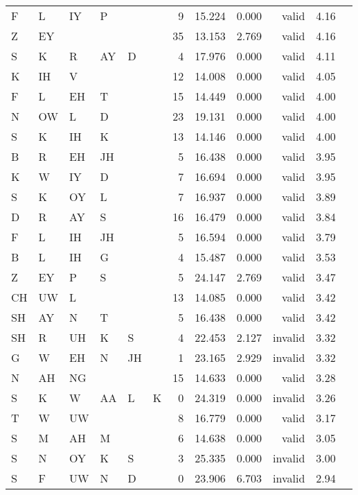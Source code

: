 \begin{longtable}{l@{ } l@{ } l@{ } l@{ } l@{ } l r r r r r r}
F  & L  & IY & P  &    &   &  9 & 15.224 & 0.000 & valid   & 4.16 \\
Z  & EY &    &    &    &   & 35 & 13.153 & 2.769 & valid   & 4.16 \\
S  & K  & R  & AY & D  &   &  4 & 17.976 & 0.000 & valid   & 4.11 \\
K  & IH & V  &    &    &   & 12 & 14.008 & 0.000 & valid   & 4.05 \\
F  & L  & EH & T  &    &   & 15 & 14.449 & 0.000 & valid   & 4.00 \\
N  & OW & L  & D  &    &   & 23 & 19.131 & 0.000 & valid   & 4.00 \\
S  & K  & IH & K  &    &   & 13 & 14.146 & 0.000 & valid   & 4.00 \\
B  & R  & EH & JH &    &   &  5 & 16.438 & 0.000 & valid   & 3.95 \\
K  & W  & IY & D  &    &   &  7 & 16.694 & 0.000 & valid   & 3.95 \\
S  & K  & OY & L  &    &   &  7 & 16.937 & 0.000 & valid   & 3.89 \\
D  & R  & AY & S  &    &   & 16 & 16.479 & 0.000 & valid   & 3.84 \\
F  & L  & IH & JH &    &   &  5 & 16.594 & 0.000 & valid   & 3.79 \\
B  & L  & IH & G  &    &   &  4 & 15.487 & 0.000 & valid   & 3.53 \\
Z  & EY & P  & S  &    &   &  5 & 24.147 & 2.769 & valid   & 3.47 \\
CH & UW & L  &    &    &   & 13 & 14.085 & 0.000 & valid   & 3.42 \\
SH & AY & N  & T  &    &   &  5 & 16.438 & 0.000 & valid   & 3.42 \\
SH & R  & UH & K  & S  &   &  4 & 22.453 & 2.127 & invalid & 3.32 \\
G  & W  & EH & N  & JH &   &  1 & 23.165 & 2.929 & invalid & 3.32 \\
N  & AH & NG &    &    &   & 15 & 14.633 & 0.000 & valid   & 3.28 \\
S  & K  & W  & AA & L  & K &  0 & 24.319 & 0.000 & invalid & 3.26 \\
T  & W  & UW &    &    &   &  8 & 16.779 & 0.000 & valid   & 3.17 \\
S  & M  & AH & M  &    &   &  6 & 14.638 & 0.000 & valid   & 3.05 \\
S  & N  & OY & K  & S  &   &  3 & 25.335 & 0.000 & invalid & 3.00 \\
S  & F  & UW & N  & D  &   &  0 & 23.906 & 6.703 & invalid & 2.94 \\

\end{longtable}
